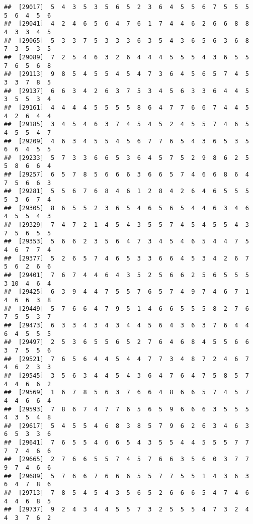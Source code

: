 \documentclass[
]{book}
\begin{document}
\begin{verbatim}
##  [29017]  5  4  3  5  3  5  6  5  2  3  6  4  5  5  6  7  5  5  5  5  6  4  5  6
##  [29041]  4  2  4  6  5  6  4  7  6  1  7  4  4  6  2  6  6  8  8  4  3  3  4  5
##  [29065]  5  3  3  7  5  3  3  3  6  3  5  4  3  6  5  6  3  6  8  7  3  5  3  5
##  [29089]  7  2  5  4  6  3  2  6  4  4  4  5  5  5  4  3  6  5  5  7  6  5  6  8
##  [29113]  9  8  5  4  5  5  4  5  4  7  3  6  4  5  6  5  7  4  5  3  3  7  8  5
##  [29137]  6  6  3  4  2  6  3  7  5  3  4  5  6  3  3  6  4  4  5  3  5  5  3  4
##  [29161]  4  4  4  4  5  5  5  5  8  6  4  7  7  6  6  7  4  4  5  4  2  6  4  4
##  [29185]  3  4  5  4  6  3  7  4  5  4  5  2  4  5  5  7  4  6  5  4  5  5  4  7
##  [29209]  4  6  3  4  5  5  4  5  6  7  7  6  5  4  3  6  5  3  5  6  6  4  5  5
##  [29233]  5  7  3  3  6  6  5  3  6  4  5  7  5  2  9  8  6  2  5  5  8  6  6  4
##  [29257]  6  5  7  8  5  6  6  6  3  6  6  5  7  4  6  6  8  6  4  7  5  6  6  3
##  [29281]  5  5  6  7  6  8  4  6  1  2  8  4  2  6  4  6  5  5  5  5  3  6  7  4
##  [29305]  8  6  5  5  2  3  6  5  4  6  5  6  5  4  4  6  3  4  6  4  5  5  4  3
##  [29329]  7  4  7  2  1  4  5  4  3  5  5  7  4  5  4  5  5  4  3  7  5  6  5  5
##  [29353]  5  6  6  2  3  5  6  4  7  3  4  5  4  6  5  4  4  7  5  4  6  7  7  4
##  [29377]  5  2  6  5  7  4  6  5  3  3  6  6  4  5  3  4  2  6  7  5  6  2  6  6
##  [29401]  7  6  7  4  4  6  4  3  5  2  5  6  6  2  5  6  5  5  5  3 10  4  6  4
##  [29425]  6  3  9  4  4  7  5  5  7  6  5  7  4  9  7  4  6  7  1  4  6  6  3  8
##  [29449]  5  7  6  6  4  7  9  5  1  4  6  6  5  5  5  8  2  7  6  7  5  5  3  7
##  [29473]  6  3  3  4  3  4  3  4  4  5  6  4  3  6  3  7  6  4  4  6  4  5  5  5
##  [29497]  2  5  3  6  5  5  6  5  2  7  6  4  6  8  4  5  5  6  6  3  7  5  5  6
##  [29521]  7  6  5  6  4  4  5  4  4  7  7  3  4  8  7  2  4  6  7  4  6  2  3  3
##  [29545]  3  5  6  3  4  4  5  4  3  6  4  7  6  4  7  5  8  5  7  4  4  6  6  2
##  [29569]  1  6  7  8  5  6  3  7  6  6  4  8  6  6  5  7  4  5  7  4  4  6  6  4
##  [29593]  7  8  6  7  4  7  7  6  5  6  5  9  6  6  6  3  5  5  5  4  3  5  4  8
##  [29617]  5  4  5  5  4  6  8  3  8  5  7  9  6  2  6  3  4  6  3  6  5  3  3  6
##  [29641]  7  6  5  5  4  6  6  5  4  3  5  5  4  4  5  5  5  7  7  7  7  4  6  6
##  [29665]  2  7  6  6  5  5  7  4  5  7  6  6  3  5  6  0  3  7  7  9  7  4  6  6
##  [29689]  5  7  6  6  7  6  6  6  5  5  7  7  5  5  1  4  3  6  3  6  4  7  8  6
##  [29713]  7  8  5  4  5  4  3  5  6  5  2  6  6  6  5  4  7  4  6  4  4  6  8  5
##  [29737]  9  2  4  3  4  4  5  5  7  3  2  5  5  5  4  7  3  2  4  4  3  7  6  2

\end{verbatim}
\end{document}
